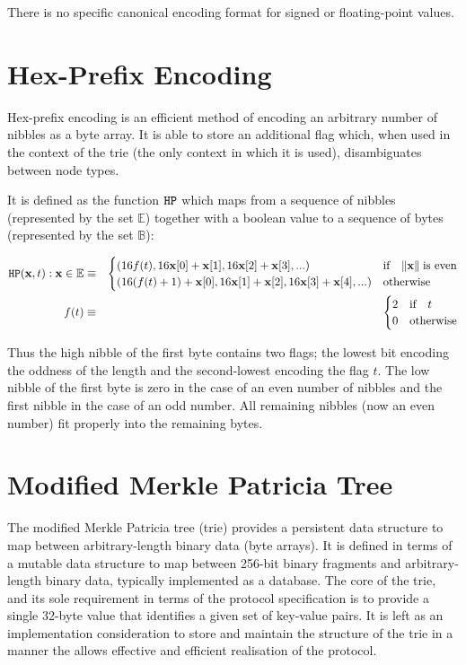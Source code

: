 \documentclass[9pt,oneside]{amsart}
\begin{document}
There is no specific canonical encoding format for signed or floating-point values.

\section{Hex-Prefix Encoding}\label{app:hexprefix}
Hex-prefix encoding is an efficient method of encoding an arbitrary number of nibbles as a byte array. It is able to store an additional flag which, when used in the context of the trie (the only context in which it is used), disambiguates between node types.

It is defined as the function $\mathtt{\tiny HP}$ which maps from a sequence of nibbles (represented by the set $\mathbb{E}$) together with a boolean value to a sequence of bytes (represented by the set $\mathbb{B}$):

\begin{eqnarray}
\mathtt{\tiny HP}(\mathbf{x}, t): \mathbf{x} \in \mathbb{E} & \equiv & \begin{cases}
(16f(t), 16\mathbf{x}[0] + \mathbf{x}[1], 16\mathbf{x}[2] + \mathbf{x}[3], ...) &
\text{if} \quad \lVert \mathbf{x} \rVert \; \text{is even} \\
(16(f(t) + 1) + \mathbf{x}[0], 16\mathbf{x}[1] + \mathbf{x}[2], 16\mathbf{x}[3] + \mathbf{x}[4], ...) &
\text{otherwise}
\end{cases} \\
f(t) & \equiv & \begin{cases} 2 & \text{if} \quad t \\ 0 & \text{otherwise} \end{cases}
\end{eqnarray}

Thus the high nibble of the first byte contains two flags; the lowest bit encoding the oddness of the length and the second-lowest encoding the flag $t$. The low nibble of the first byte is zero in the case of an even number of nibbles and the first nibble in the case of an odd number. All remaining nibbles (now an even number) fit properly into the remaining bytes.

\section{Modified Merkle Patricia Tree}\label{app:trie}
The modified Merkle Patricia tree (trie) provides a persistent data structure to map between arbitrary-length binary data (byte arrays). It is defined in terms of a mutable data structure to map between 256-bit binary fragments and arbitrary-length binary data, typically implemented as a database. The core of the trie, and its sole requirement in terms of the protocol specification is to provide a single 32-byte value that identifies a given set of key-value pairs. It is left as an implementation consideration to store and maintain the structure of the trie in a manner the allows effective and efficient realisation of the protocol.
\end{document}

